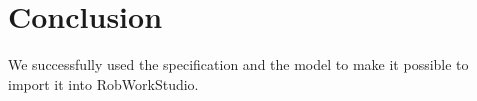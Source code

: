 \section{Conclusion}
\label{sec:conclusion}

We successfully used the specification and the model to make it possible to import it into RobWorkStudio. 